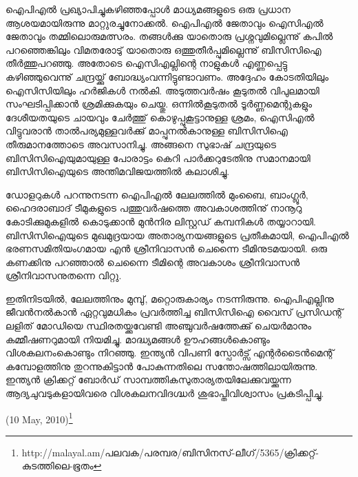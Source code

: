 

ഐപിഎല്‍ പ്രഖ്യാപിച്ചുകഴിഞ്ഞപ്പോള്‍ മാധ്യമങ്ങളുടെ ഒരു പ്രധാന ആശയമായിരുന്നു മാറ്റുരച്ചുനോക്കല്‍. ഐപിഎല്‍ 
ജേതാവും ഐസിഎല്‍ ജേതാവും തമ്മിലൊരുമത്സരം. തങ്ങള്‍ക്കു യാതൊരു പ്രശ്നവുമില്ലെന്നു് കപില്‍ പറഞ്ഞെങ്കിലും 
വിമതരോടു് യാതൊരു ഒത്തുതീര്‍പ്പുമില്ലെന്നു് ബിസിസിഐ തീര്‍ത്തുപറഞ്ഞു. അതോടെ ഐസിഎല്ലിന്റെ നാളുകള്‍ 
എണ്ണപ്പെട്ടു കഴിഞ്ഞുവെന്നു് ചന്ദ്രയ്ക്കു് ബോദ്ധ്യംവന്നിട്ടുണ്ടാവണം. അദ്ദേഹം കോടതിയിലും ഐസിസിയിലും ഹര്‍ജികള്‍ 
നല്‍കി. അടുത്തവര്‍ഷം കൂടുതല്‍ വിപുലമായി സംഘടിപ്പിക്കാന്‍ ശ്രമിക്കുകയും ചെയ്തു. ഒന്നില്‍കൂടുതല്‍ ടൂര്‍ണ്ണമെന്റുകളും 
ദേശീയതയുടെ ചായവും ചേര്‍ത്തു് കൊഴുപ്പുകൂട്ടാനുള്ള ശ്രമം, ഐസിഎല്‍ വിട്ടുവരാന്‍ താല്‍പര്യമുള്ളവര്‍ക്കു് മാപ്പുനല്‍കാനുള്ള 
ബിസിസിഐ തീരുമാനത്തോടെ അവസാനിച്ചു. അങ്ങനെ സുഭാഷ് ചന്ദ്രയുടെ ബിസിസിഐയുമായുള്ള 
പോരാട്ടം കെറി പാര്‍ക്കറുടേതിനു സമാനമായി ബിസിസിഐയുടെ അന്തിമവിജയത്തില്‍ കലാശിച്ചു.

ഡോളറുകള്‍ പറന്നുനടന്ന ഐപിഎല്‍ ലേലത്തില്‍ മുംബൈ, ബാംഗ്ലൂര്‍, ഹൈദരാബാദ് ടീമുകളുടെ പത്തുവര്‍ഷത്തെ 
അവകാശത്തിനു് നാനൂറു കോടിക്കുമുകളില്‍ കൊടുക്കാന്‍ മുന്‍നിര ലിസ്റ്റഡ് കമ്പനികള്‍ തയ്യാറായി. ബിസിസിഐയുടെ 
മുഖമുദ്രയായ അതാര്യനയങ്ങളുടെ പ്രതീകമായി, ഐപിഎല്‍ ഭരണസമിതിയംഗമായ എന്‍ ശ്രീനിവാസന്‍ ചെന്നൈ 
ടീമിനുടമയായി. ഒരു കണക്കിനു പറഞ്ഞാല്‍ ചെന്നൈ ടീമിന്റെ അവകാശം ശ്രീനിവാസന്‍ ശ്രീനിവാസനുതന്നെ വിറ്റു.

ഇതിനിടയില്‍, ലേലത്തിനും മുമ്പു്, മറ്റൊരുകാര്യം നടന്നിരുന്നു. ഐപിഎല്ലിനു ജീവന്‍നല്‍കാന്‍ ഏറ്റവുമധികം പ്രവര്‍ത്തിച്ച 
ബിസിസിഐ വൈസ് പ്രസിഡന്റ് ലളിത് മോഡിയെ സ്ഥിരതയ്ക്കുവേണ്ടി അഞ്ചുവര്‍ഷത്തേക്കു് ചെയര്‍മാനും കമ്മീഷണറുമായി 
നിയമിച്ചു. മാദ്ധ്യമങ്ങള്‍ ഊഹങ്ങള്‍കൊണ്ടും വിശകലനംകൊണ്ടും നിറഞ്ഞു. ഇന്ത്യന്‍ വിപണി സ്പോര്‍ട്സ് 
എന്റര്‍ടൈന്‍മെന്റ് കമ്പോളത്തിനു തുറന്നുകിട്ടാന്‍ പോകുന്നതിലെ സന്തോഷത്തിലായിരുന്നു. ഇന്ത്യന്‍ ക്രിക്കറ്റ് ബോര്‍ഡ് 
സാമ്പത്തികസുതാര്യതയിലേക്കുവയ്ക്കുന്ന ആദ്യചുവടുകളായിവരെ വിശകലനവിദഗ്ദ്ധര്‍ ശുഭാപ്തിവിശ്വാസം പ്രകടിപ്പിച്ചു.

\hspace*{2em}(10 May, 2010)\footnote{http://malayal.am/പലവക/പരമ്പര/ബിസിനസ്-ലീഗ്/5365/ക്രിക്കറ്റ്-കുടത്തിലെ-ഭൂതം}

\newpage
